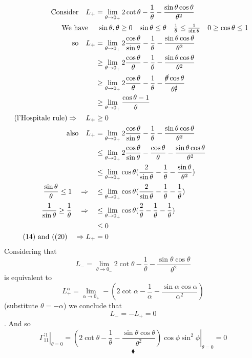 \begin{align}
\text{Consider}\quad L_{+}& = \lim_{\theta \to 0_{+}}2\cot\theta -\frac{1}{\theta}-\frac{\sin\theta\cos\theta}{\theta^2} \\
\text{We have}\quad &\begin{array}{lllll}
\sin\theta , \theta \ge 0&\sin\theta \leq \theta&\frac{1}{\theta}\leq \frac{1}{\sin \theta}& 0 \ge \cos \theta \leq 1\end{array}\\
\text{so} \quad L_{+}&= \lim_{\theta \to 0_{+}}2\frac{\cos\theta}{\sin\theta} -\frac{1}{\theta}-\frac{\sin\theta\cos\theta}{\theta^2} \\
\ &\geq \lim_{\theta \to 0_{+}}2\frac{\cos\theta}{\theta} -\frac{1}{\theta}-\frac{\sin\theta\cos\theta}{\theta^2} \\
\ &\geq \lim_{\theta \to 0_{+}}2\frac{\cos\theta}{\theta} -\frac{1}{\theta}-\frac{\cancel{\theta}\cos\theta}{\theta^{\cancel{2} }}\\
\ &\geq \lim_{\theta \to 0_{+}}\frac{\cos\theta-1}{\theta}\\
\text{(l'Hospitale rule)}\Rightarrow\quad L_{+}&\geq 0\\
\text{also} \quad L_{+}&= \lim_{\theta \to 0_{+}}2\frac{\cos\theta}{\sin\theta} -\frac{1}{\theta}-\frac{\sin\theta\cos\theta}{\theta^2} \\
\ &\leq \lim_{\theta \to 0_{+}}2\frac{\cos\theta}{\sin\theta} -\frac{\cos\theta}{\theta}-\frac{\sin\theta\cos\theta}{\theta^2} \\
\ &\leq \lim_{\theta \to 0_{+}}\cos\theta(\frac{2}{\sin\theta} -\frac{1}{\theta}-\frac{\sin\theta}{\theta^2})\\
\frac{\sin\theta}{\theta} \leq 1 \quad\Rightarrow\quad &\leq\lim_{\theta \to 0_{+}} \cos\theta(\frac{2}{\sin\theta} -\frac{1}{\theta}-\frac{1}{\theta})\\
\frac{1}{\sin\theta} \geq \frac{1}{\theta} \quad\Rightarrow\quad &\leq\lim_{\theta \to 0_{+}} \cos\theta(\frac{2}{\theta} -\frac{1}{\theta}-\frac{1}{\theta})\\
\ & \leq 0\\
\text{(14) and ((20)}\quad \Rightarrow L_{+}& =0
\end{align} 
Considering that $$L_{-} = \lim_{\theta \to 0_{-}}2\cot\theta -\frac{1}{\theta}-\frac{\sin\theta\cos\theta}{\theta^2}$$ is equivalent to  $$L_{+}^{\alpha} = \lim_{\alpha \to 0_{+}}-(2\cot\alpha -\frac{1}{\alpha}-\frac{\sin\alpha\cos\alpha}{\alpha^2})$$ (substitute $\theta = -\alpha$) we conclude that   $$L_{-} =  -L_{+}=0$$. And so $$\left.\Gamma_{11}^{'1}\right|_{\theta=0} =\left.(2\cot\theta -\frac{1}{\theta}-\frac{\sin\theta\cos\theta}{\theta^2})\cos\phi\sin^2\phi\right|_{\theta=0} = 0$$
$$\blacklozenge$$
\newpage

